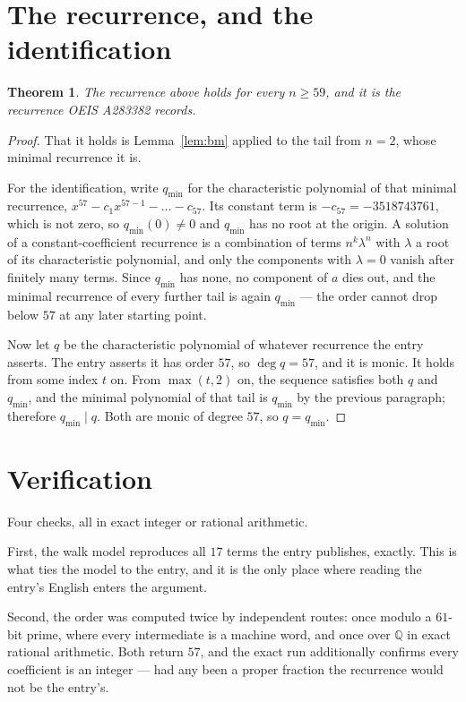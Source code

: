 \documentclass[11pt,a4paper]{article}
\theoremstyle{plain}
\newtheorem{theorem}{Theorem}
\theoremstyle{definition}
\begin{document}
\section{The recurrence, and the identification}

\begin{theorem}
The recurrence above holds for every $n\ge59$, and it is the recurrence OEIS A283382 records.
\end{theorem}

\begin{proof}
That it holds is Lemma~\ref{lem:bm} applied to the tail from $n=2$, whose minimal
recurrence it is.

For the identification, write $q_{\min}$ for the characteristic polynomial of that minimal
recurrence, $x^{57}-c_1x^{57-1}-\dots-c_{57}$. Its constant term is
$-c_{57}=-3518743761$, which is not zero, so $q_{\min}(0)\neq0$ and $q_{\min}$ has no
root at the origin. A solution of a constant-coefficient recurrence is a combination of terms
$n^{k}\lambda^{n}$ with $\lambda$ a root of its characteristic polynomial, and only the
components with $\lambda=0$ vanish after finitely many terms. Since $q_{\min}$ has none, no
component of $a$ dies out, and the minimal recurrence of every further tail is again
$q_{\min}$ --- the order cannot drop below $57$ at any later starting point.

Now let $q$ be the characteristic polynomial of whatever recurrence the entry asserts. The
entry asserts it has order $57$, so $\deg q=57$, and it is monic. It holds from some
index $t$ on. From $\max(t,2)$ on, the sequence satisfies both $q$ and $q_{\min}$, and
the minimal polynomial of that tail is $q_{\min}$ by the previous paragraph; therefore
$q_{\min}\mid q$. Both are monic of degree $57$, so $q=q_{\min}$.
\end{proof}

\section{Verification}

Four checks, all in exact integer or rational arithmetic.

First, the walk model reproduces all $17$ terms the entry publishes, exactly. This is
what ties the model to the entry, and it is the only place where reading the entry's English
enters the argument.

Second, the order was computed twice by independent routes: once modulo a $61$-bit prime, where
every intermediate is a machine word, and once over $\mathbb{Q}$ in exact rational arithmetic.
Both return $57$, and the exact run additionally confirms every coefficient is an integer
--- had any been a proper fraction the recurrence would not be the entry's.
\end{document}
